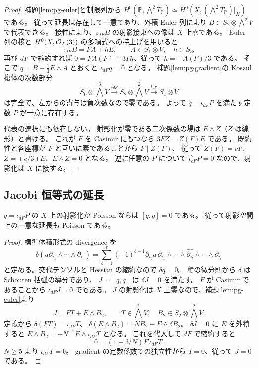 \begin{proof}
補題\ref{lem:pg-euler}と制限列から
$H^0(\mathbb P,\bigwedge^2T_{\mathbb P})\simeq
H^0(X,(\bigwedge^2T_{\mathbb P})|_X)$ である。
従って延長は存在して一意であり、外積 Euler 列により
$B\in S_2\otimes\bigwedge^2V$ で代表できる。
接性により、$\iota_{dF}B$ の射影接束への像は $X$ 上零である。
Euler 列の核と $H^0(X,\mathcal O_X(3))$ の多項式への持上げを用いると
\[
\iota_{dF}B=FA+hE,\qquad A\in S_1\otimes V,\quad h\in S_3.
\]
再び $dF$ で縮約すれば $0=FA(F)+3Fh$、従って $h=-A(F)/3$ である。
そこで $q=B-\frac13E\wedge A$ とおくと $\iota_{dF}q=0$ となる。
補題\ref{lem:pg-gradient}の Koszul 複体の次数部分
\[
S_0\otimes\bigwedge^3V\xrightarrow{\iota_{dF}}
S_2\otimes\bigwedge^2V\xrightarrow{\iota_{dF}}S_4\otimes V
\]
は完全で、左からの寄与は負次数なので零である。
よって $q=\iota_{dF}P$ を満たす定数 $P$ が一意に存在する。

代表の選択にも依存しない。
射影化が零である二次係数の場は $E\wedge Z$（$Z$ は線形）と書ける。
これが $F$ を Casimir にもつなら $3FZ=Z(F)E$ である。
既約性と各座標が $F$ と互いに素であることから $F\mid Z(F)$、
従って $Z(F)=cF$、$Z=(c/3)E$、$E\wedge Z=0$ となる。
逆に任意の $P$ について $\iota_{dF}^2P=0$ なので、射影化は $X$ に接する。
\end{proof}

\subsection{Jacobi 恒等式の延長}
\begin{proposition}\label{prop:pg-jacobi-extension}
$q=\iota_{dF}P$ の $X$ 上の射影化が Poisson ならば $[q,q]=0$ である。
従って射影空間上の一意な延長も Poisson である。
\end{proposition}
\begin{proof}
標準体積形式の divergence を
\[
\delta(a\partial_{i_1}\wedge\cdots\wedge\partial_{i_r})
=\sum_{b=1}^r(-1)^{b-1}\partial_{i_b}a\,
\partial_{i_1}\wedge\cdots\wedge\widehat{\partial_{i_b}}\wedge\cdots\wedge\partial_{i_r}
\]
と定める。交代テンソルと Hessian の縮約なので $\delta q=0$。
積の微分則から $\delta$ は Schouten 括弧の導分であり、
$J=[q,q]$ は $\delta J=0$ を満たす。
$F$ が Casimir であることから $\iota_{dF}J=0$ でもある。
$J$ の射影化は $X$ 上零なので、補題\ref{lem:pg-euler}より
\[
J=FT+E\wedge B_2,\qquad T\in\bigwedge^3V,
\quad B_2\in S_2\otimes\bigwedge^2V.
\]
定義から $\delta(FT)=\iota_{dF}T$、
$\delta(E\wedge B_2)=NB_2-E\wedge\delta B_2$。
$\delta J=0$ に $E$ を外積すると
$E\wedge B_2=-N^{-1}E\wedge\iota_{dF}T$ となる。
これを代入して $dF$ で縮約すると
\[
0=(1-3/N)F\,\iota_{dF}T.
\]
$N\geq5$ より $\iota_{dF}T=0$。
gradient の定数係数での独立性から $T=0$、従って $J=0$ である。
\end{proof}

